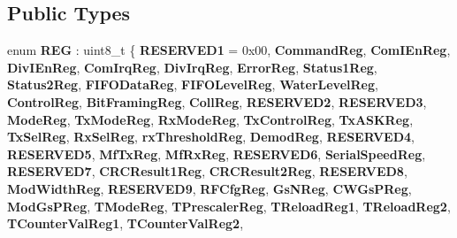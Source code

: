 \subsection*{Public Types}
\begin{DoxyCompactItemize}
\item 
\mbox{\label{class_m_f_r_c522_ae7ec09eb8c9c61288a4770175b4b8db7}} 
enum {\bfseries R\+EG} \+: uint8\+\_\+t \{ \newline
{\bfseries R\+E\+S\+E\+R\+V\+E\+D1} = 0x00, 
{\bfseries Command\+Reg}, 
{\bfseries Com\+I\+En\+Reg}, 
{\bfseries Div\+I\+En\+Reg}, 
\newline
{\bfseries Com\+Irq\+Reg}, 
{\bfseries Div\+Irq\+Reg}, 
{\bfseries Error\+Reg}, 
{\bfseries Status1\+Reg}, 
\newline
{\bfseries Status2\+Reg}, 
{\bfseries F\+I\+F\+O\+Data\+Reg}, 
{\bfseries F\+I\+F\+O\+Level\+Reg}, 
{\bfseries Water\+Level\+Reg}, 
\newline
{\bfseries Control\+Reg}, 
{\bfseries Bit\+Framing\+Reg}, 
{\bfseries Coll\+Reg}, 
{\bfseries R\+E\+S\+E\+R\+V\+E\+D2}, 
\newline
{\bfseries R\+E\+S\+E\+R\+V\+E\+D3}, 
{\bfseries Mode\+Reg}, 
{\bfseries Tx\+Mode\+Reg}, 
{\bfseries Rx\+Mode\+Reg}, 
\newline
{\bfseries Tx\+Control\+Reg}, 
{\bfseries Tx\+A\+S\+K\+Reg}, 
{\bfseries Tx\+Sel\+Reg}, 
{\bfseries Rx\+Sel\+Reg}, 
\newline
{\bfseries rx\+Threshold\+Reg}, 
{\bfseries Demod\+Reg}, 
{\bfseries R\+E\+S\+E\+R\+V\+E\+D4}, 
{\bfseries R\+E\+S\+E\+R\+V\+E\+D5}, 
\newline
{\bfseries Mf\+Tx\+Reg}, 
{\bfseries Mf\+Rx\+Reg}, 
{\bfseries R\+E\+S\+E\+R\+V\+E\+D6}, 
{\bfseries Serial\+Speed\+Reg}, 
\newline
{\bfseries R\+E\+S\+E\+R\+V\+E\+D7}, 
{\bfseries C\+R\+C\+Result1\+Reg}, 
{\bfseries C\+R\+C\+Result2\+Reg}, 
{\bfseries R\+E\+S\+E\+R\+V\+E\+D8}, 
\newline
{\bfseries Mod\+Width\+Reg}, 
{\bfseries R\+E\+S\+E\+R\+V\+E\+D9}, 
{\bfseries R\+F\+Cfg\+Reg}, 
{\bfseries Gs\+N\+Reg}, 
\newline
{\bfseries C\+W\+Gs\+P\+Reg}, 
{\bfseries Mod\+Gs\+P\+Reg}, 
{\bfseries T\+Mode\+Reg}, 
{\bfseries T\+Prescaler\+Reg}, 
\newline
{\bfseries T\+Reload\+Reg1}, 
{\bfseries T\+Reload\+Reg2}, 
{\bfseries T\+Counter\+Val\+Reg1}, 
{\bfseries T\+Counter\+Val\+Reg2}, 
\newline

\end{DoxyCompactItemize}

